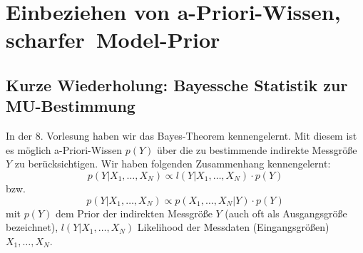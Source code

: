 

% 

\section{Einbeziehen von a-Priori-Wissen, \glqq scharfer\grqq ~Model-Prior}
\subsection{Kurze Wiederholung: Bayessche Statistik zur MU-Bestimmung}
In der 8. Vorlesung haben wir das Bayes-Theorem kennengelernt. 
Mit diesem ist es möglich a-Priori-Wissen $p(Y)$ über die zu bestimmende indirekte Messgröße $Y$ zu berücksichtigen.
Wir haben folgenden Zusammenhang kennengelernt: 
\begin{equation}
p(Y|X_1,\ldots,X_N) \propto l(Y|X_1,\ldots,X_N) \cdot p(Y) 
\label{eq:BayesTheorem}
\end{equation} 
bzw. 
\[
p(Y|X_1,\ldots,X_N) \propto p(X_1,\ldots,X_N|Y) \cdot p(Y) 
\] 
mit $p(Y)$ dem Prior der indirekten Messgröße $Y$ (auch oft als Ausgangsgröße bezeichnet), $l(Y|X_1,\ldots,X_N)$ Likelihood der Messdaten 
(Eingangsgrößen) $X_1,\ldots,X_N$. 

